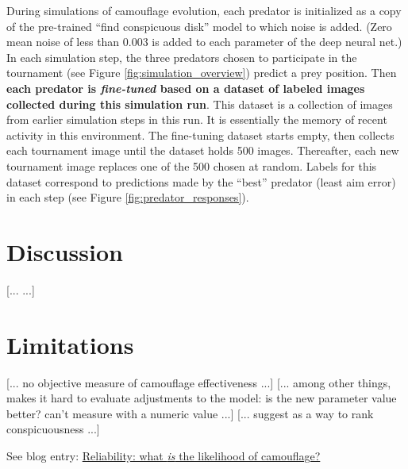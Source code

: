 \documentclass[sigconf]{acmart}
\newcommand{\jargon}[1]{\textit{#1}}
\begin{document}
\par
During simulations of camouflage evolution, each predator is initialized as a copy of the pre-trained “find conspicuous disk” model to which noise is added. (Zero mean noise of less than 0.003 is added to each parameter of the deep neural net.) In each simulation step, the three predators chosen to participate in the tournament (see Figure \ref{fig:simulation_overview}) predict a prey position. Then \textbf{each predator is \jargon{fine-tuned} based on a dataset of labeled images collected during this simulation run}. This dataset is a collection of images from earlier simulation steps in this run. It is essentially the memory of recent activity in this environment. The fine-tuning dataset starts empty, then collects each tournament image until the dataset holds 500 images. Thereafter, each new tournament image replaces one of the 500 chosen at random. Labels for this dataset correspond to predictions made by the “best” predator (least aim error) in each step (see Figure \ref{fig:predator_responses}).
\par


\section{Discussion}
[... ...]


\section{Limitations}
[... no objective measure of camouflage effectiveness ...]
[... among other things, makes it hard to evaluate adjustments to the model: is the new parameter value better? can't measure with a numeric value ...]
[... suggest  \cite{lv_cod_2022} as a way to rank conspicuousness ...]
\par
See blog entry: \href{https://cwreynolds.github.io/TexSyn/#20220930}{Reliability: what \textit{is} the likelihood of camouflage?}
\par
[... all results are hand selected, “cherry picked” ...] 
\par
[... in email to Ken I wrote: \textit{The aspect of my project I'm unsure how to approach is lack of rigor. My evaluations are all subjective. It comes down to “we can see that the effectiveness of the camouflage clearly increases during the simulation.”}]
\par
[... inherently 2d ...]
\par
[... texture synthesis lacks genetic or biological plausibility ...]
\par
\end{document}
